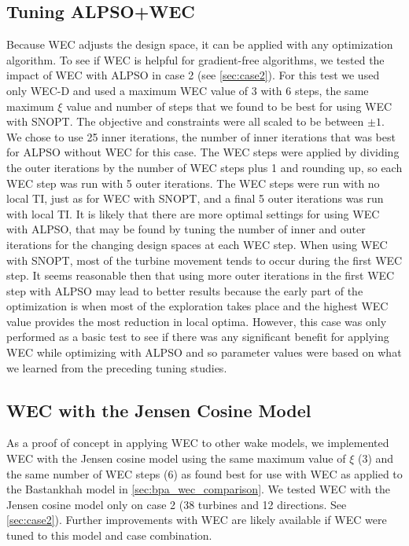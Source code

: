 \documentclass{jpconf}
\begin{document}
\subsection{Tuning ALPSO+WEC}
Because WEC adjusts the design space, it can be applied with any optimization algorithm. To see if WEC is helpful for gradient-free algorithms, we tested the impact of WEC with ALPSO in case 2 (see \cref{sec:case2}). For this test we used only WEC-D and used a maximum WEC value of 3 with 6 steps, the same maximum $\xi$ value and number of steps that we found to be best for using WEC with SNOPT. The objective and constraints were all scaled to be between $\pm1$. We chose to use 25 inner iterations, the number of inner iterations that was best for ALPSO without WEC for this case. The WEC steps were applied by dividing the outer iterations by the number of WEC steps plus 1 and rounding up, so each WEC step was run with 5 outer iterations. The WEC steps were run with no local TI, just as for WEC with SNOPT, and a final 5 outer iterations was run with local TI. It is likely that there are more optimal settings for using WEC with ALPSO, that may be found by tuning the number of inner and outer iterations for the changing design spaces at each WEC step. When using WEC with SNOPT, most of the turbine movement tends to occur during the first WEC step. It seems reasonable then that using more outer iterations in the first WEC step with ALPSO may lead to better results because the early part of the optimization is when most of the exploration takes place and the highest WEC value provides the most reduction in local optima. However, this case was only performed as a basic test to see if there was any significant benefit for applying WEC while optimizing with ALPSO and so parameter values were based on what we learned from the preceding tuning studies.

\subsection{WEC with the Jensen Cosine Model}
As a proof of concept in applying WEC to other wake models, we implemented WEC with the Jensen cosine model using the same maximum value of $\xi$ (3) and the same number of WEC steps (6) as found best for use with WEC as applied to the Bastankhah model in \cref{sec:bpa_wec_comparison}. We tested WEC with the Jensen cosine model only on case 2 (38 turbines and 12 directions. See \cref{sec:case2}). Further improvements with WEC are likely available if WEC were tuned to this model and case combination.
\end{document}
